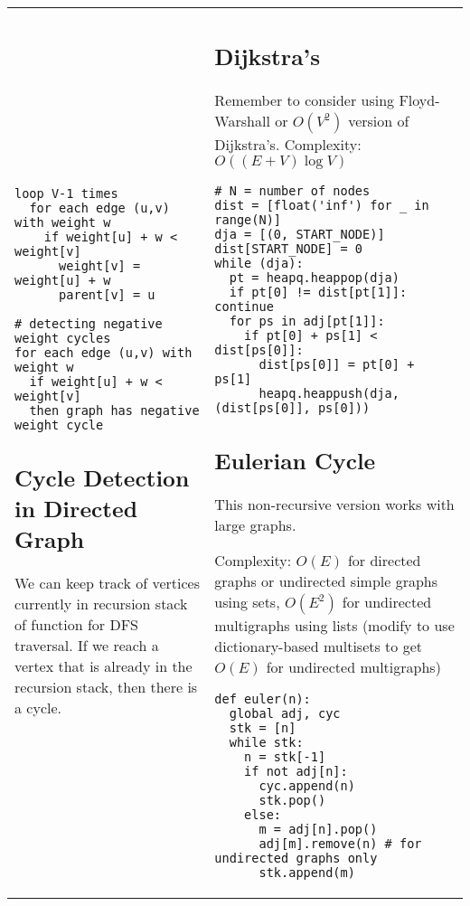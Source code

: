 \documentclass[letterpaper]{article}
\begin{document}
\begin{tabular}{@{}p{9cm}p{9cm}@{}}
\begin{lstlisting}
loop V-1 times
  for each edge (u,v) with weight w
    if weight[u] + w < weight[v]
      weight[v] = weight[u] + w
      parent[v] = u

# detecting negative weight cycles
for each edge (u,v) with weight w
  if weight[u] + w < weight[v]
  then graph has negative weight cycle
\end{lstlisting}


    \subsection{Cycle Detection in Directed Graph}

    We can keep track of vertices currently in recursion stack of function for DFS traversal. If we reach a vertex that is already in the recursion stack, then there is a cycle. %
     &
    \subsection{Dijkstra's}

    Remember to consider using Floyd-Warshall or $O\left(V^2\right)$ version of Dijkstra's. Complexity: $O\left(\left(E+V\right)\log V\right)$

    \begin{lstlisting}
# N = number of nodes
dist = [float('inf') for _ in range(N)]
dja = [(0, START_NODE)]
dist[START_NODE] = 0
while (dja):
  pt = heapq.heappop(dja)
  if pt[0] != dist[pt[1]]: continue
  for ps in adj[pt[1]]:
    if pt[0] + ps[1] < dist[ps[0]]:
      dist[ps[0]] = pt[0] + ps[1]
      heapq.heappush(dja,(dist[ps[0]], ps[0]))
\end{lstlisting}

    \subsection{Eulerian Cycle}

    This non-recursive version works with large graphs.

    Complexity: $O(E)$ for directed graphs or undirected simple graphs using sets,
    $O(E^2)$ for undirected multigraphs using lists (modify to use dictionary-based
    multisets to get $O(E)$ for undirected multigraphs)

    \begin{lstlisting}
def euler(n):
  global adj, cyc
  stk = [n]
  while stk:
    n = stk[-1]
    if not adj[n]:
      cyc.append(n)
      stk.pop()
    else:
      m = adj[n].pop()
      adj[m].remove(n) # for undirected graphs only
      stk.append(m)
\end{lstlisting}


\end{tabular}
\end{document}
